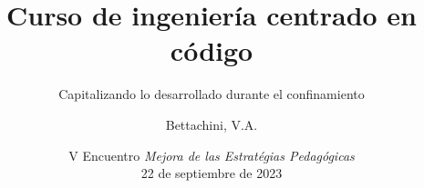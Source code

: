 \documentclass[aspectratio=43]{beamer}
\begin{document}
\title{Curso de ingeniería centrado en código}
\subtitle{Capitalizando lo desarrollado durante el confinamiento}
\author[vbettachini@unlam.edu.ar]{Bettachini, V.A.}
\date[2023-09-22]{
	V Encuentro \emph{Mejora de las Estratégias Pedagógicas}\\22 de septiembre de 2023
}


\begin{frame} 
  \titlepage
\end{frame}

\end{document}
